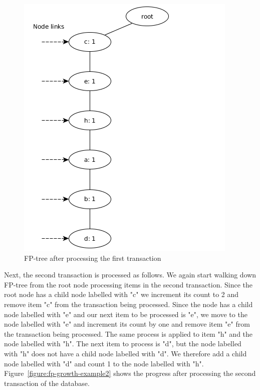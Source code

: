 \begin{figure} %
	\centering
	\includegraphics[scale=0.5]{fp-tree-example/fp-tree-p1.png}
	\caption{FP-tree after processing the first transaction}
	\label{figure:fp-growth-example1}
\end{figure}

Next, the second transaction is processed as follows. We again start walking down FP-tree from the root node processing items in the second transaction. Since the root node has a child node labelled with "c" we increment its count to 2 and remove item "c" from the transaction being processed. Since the node has a child node labelled with "e" and our next item to be processed is "e", we move to the node labelled with "e" and increment its count by one and remove item "e" from the transaction being processed. The same process is applied to item "h" and the node labelled with "h". The next item to process is "d", but the node labelled with "h" does not have a child node labelled with "d". We therefore add a child node labelled with "d" and count 1 to the node labelled with "h". Figure~\ref{figure:fp-growth-example2} shows the progress after processing the second transaction of the database.

